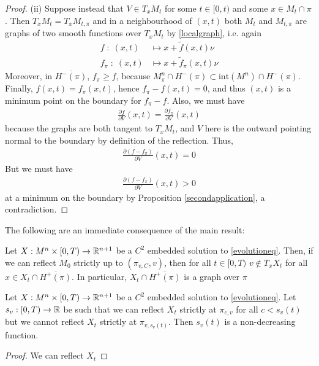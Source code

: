 \begin{proof}
	(ii) Suppose instead that $V\in T_xM_t$  for some $t\in [0, t)$ and some $x\in M_t\cap \pi$. Then $T_xM_t= T_xM_{t, \pi}$ and in a neighbourhood of $(x, t)$ both $M_t$ and $M_{t, \pi}$ are graphs of two smooth functions over $T_xM_t$ by \ref{localgraph}, i.e. again
	\begin{align*}
		f \; : \; (x, t) &\mapsto x+\tilde{f}(x, t)\nu \\
		f_\pi \; : \; (x, t) &\mapsto x+\tilde{f}_\pi(x, t)\nu 
	\end{align*} 
	Moreover, in $\overline{H^-(\pi)}$, $f_\pi\geq f$, because $M^n_\pi\cap H^-(\pi)\subset \mathrm{int}(M^n)\cap H^-(\pi)$. Finally, $f(x, t)=f_\pi (x, t)$, hence $f_\pi-f (x, t)=0$, and thus  $(x, t)$ is a minimum point on the boundary for $f_\pi-f$. Also, we must have
	\begin{align*}
		\frac{\partial f}{\partial V}(x,t)=\frac{\partial f_\pi}{\partial V}(x,t)
	\end{align*}
	because the graphs are both tangent to $T_xM_t$, and $V$ here is the outward pointing normal to the boundary by definition of the reflection. Thus, 
	\begin{align*}
		\frac{\partial (f- f_\pi)}{\partial V}(x,t)=0
	\end{align*}
	But we must have 
	\begin{align*}
		\frac{\partial (f- f_\pi)}{\partial V}(x,t)>0
	\end{align*}
	at a minimum on the boundary by Proposition \ref{secondapplication}, a contradiction.  
\end{proof}
The following are an immediate consequence of the main result:
\begin{cor}
	Let $X:M^n\times [0,T) \rightarrow \mathbb{R}^{n+1}$ be a $C^2$ embedded solution to \ref{evolutioneq}. Then, if we can reflect $M_0$ strictly up to $(\pi_{v,C},v)$, then for all $t\in [0,T)$ $v\notin T_xX_t$ for all $x\in X_t\cap\overline{H^+(\pi)}$. In particular,  $ X_t\cap\overline{H^+(\pi)}$ is a graph over $\pi$
\end{cor}


\begin{cor}
	Let $X:M^n\times [0,T) \rightarrow \mathbb{R}^{n+1}$ be a $C^2$ embedded solution to \ref{evolutioneq}. Let $s_v:[0,T) \rightarrow \mathbb{R}$ be such that we can reflect $X_t$ strictly at $\pi_{c, v}$ for all $c<s_v(t)$ but we cannot reflect $X_t$ strictly at $\pi_{v, s_v(t)}$. Then $s_v(t)$ is a non-decreasing function. 
\end{cor}
\begin{proof}
We can reflect $X_t$ 
\end{proof}


